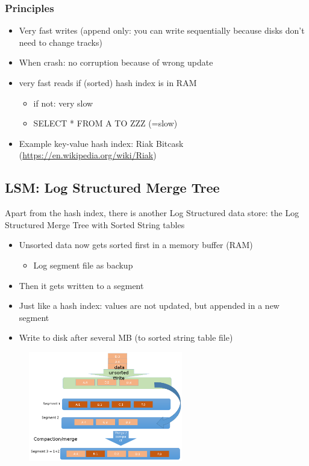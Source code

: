 \documentclass{article}
\begin{document}
\subsubsection{Principles}

\begin{itemize}
    \item Very fast writes (append only: you can write sequentially because disks don't need to change tracks)
    \item When crash: no corruption because of wrong update
    \item very fast reads if (sorted) hash index is in RAM
    \begin{itemize}
        \item if not: very slow
        \item SELECT * FROM A TO ZZZ (=slow)
    \end{itemize}
    \item Example key-value hash index: Riak Bitcask (\url{https://en.wikipedia.org/wiki/Riak})
\end{itemize}

\subsection{LSM: Log Structured Merge Tree}

Apart from the hash index, there is another Log Structured data store: the Log Structured Merge Tree with Sorted String tables

\begin{itemize}
    \item Unsorted data now gets sorted first in a memory buffer (RAM)
    \begin{itemize}
        \item Log segment file as backup
    \end{itemize}
    \item Then it gets written to a segment
    \item Just like a hash index: values are not updated, but appended in a new segment
    \item Write to disk after several MB (to sorted string table file)
\end{itemize}

\begin{figure}[H]
    \centering
    \includegraphics[width=0.6\textwidth]{lsm.png}
\end{figure}
\end{document}
